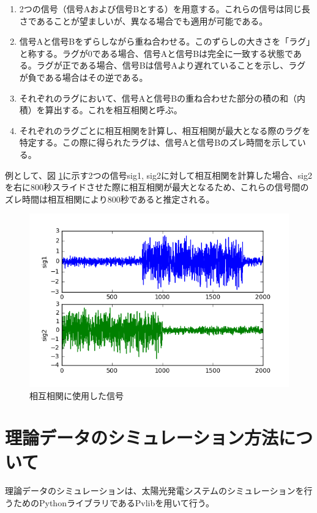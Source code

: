 \documentclass[a4j,12pt,]{jarticle}
\begin{document}
\begin{enumerate}
\item 2つの信号（信号Aおよび信号Bとする）を用意する。これらの信号は同じ長さであることが望ましいが、異なる場合でも適用が可能である。
\item 信号Aと信号Bをずらしながら重ね合わせる。このずらしの大きさを「ラグ」と称する。ラグが0である場合、信号Aと信号Bは完全に一致する状態である。ラグが正である場合、信号Bは信号Aより遅れていることを示し、ラグが負である場合はその逆である。
\item それぞれのラグにおいて、信号Aと信号Bの重ね合わせた部分の積の和（内積）を算出する。これを相互相関と呼ぶ。
\item それぞれのラグごとに相互相関を計算し、相互相関が最大となる際のラグを特定する。この際に得られたラグは、信号Aと信号Bのズレ時間を示している。
\end{enumerate}

例として、図 \ref{p1}に示す2つの信号sig1, sig2に対して相互相関を計算した場合、sig2を右に800秒スライドさせた際に相互相関が最大となるため、これらの信号間のズレ時間は相互相関により800秒であると推定される。

\begin{figure}[H]
  \begin{center}
    \includegraphics[width=160mm]{1.png}
    \caption{相互相関に使用した信号}
    \label{p1}
  \end{center}
\end{figure}

\section{理論データのシミュレーション方法について}
理論データのシミュレーションは、太陽光発電システムのシミュレーションを行うためのPythonライブラリであるPvlibを用いて行う。
\end{document}
